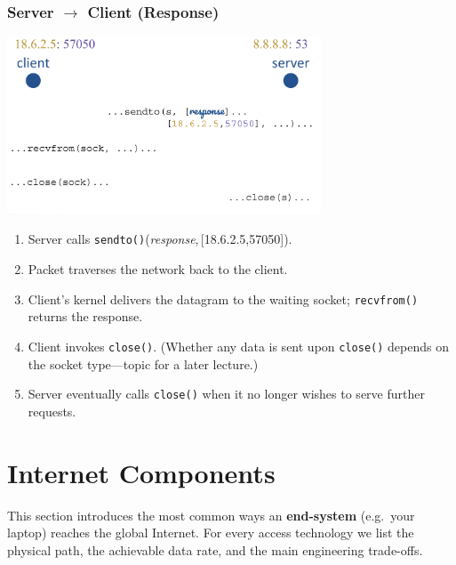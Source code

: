 \documentclass[../../compsys.tex]{subfiles}
\begin{document}
\begin{minipage}[t]{0.45\textwidth}
    \small
\subsubsection*{Server $\rightarrow$ Client (Response)}
\vspace{10px}
\begin{center}
  \includegraphics[width=0.7\textwidth]{images/server-to-client-syscalls.png}
\end{center}

\begin{enumerate}
  \item Server calls \texttt{sendto()}(\textit{response},\,[18.6.2.5,57050]).
  \item Packet traverses the network back to the client.
  \item Client's kernel delivers the datagram to the waiting socket; \texttt{recvfrom()} returns the response.
  \item Client invokes \texttt{close()}.  (Whether any data is sent upon \texttt{close()} depends on the socket type—topic for a later lecture.)
  \item Server eventually calls \texttt{close()} when it no longer wishes to serve further requests.
\end{enumerate}
\end{minipage}
\section{Internet Components}\label{sec:intcomp}
This section introduces the most common ways an \textbf{end-system}
(e.g.\ your laptop) reaches the global Internet.  
For every access technology we list the physical path, the achievable data
rate, and the main engineering trade-offs.

\end{document}
